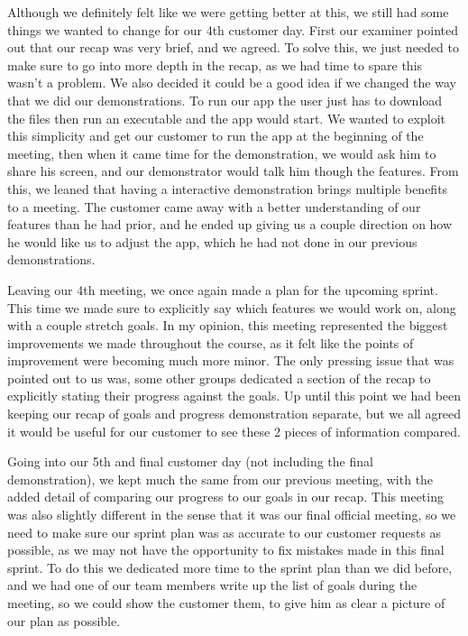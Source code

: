 \documentclass{l3proj}
\begin{document}
Although we definitely felt like we were getting better at this, we still had some things we wanted to change for our 4th customer day. First our examiner pointed out that our recap was very brief, and we agreed. To solve this, we just needed to make sure to go into more depth in the recap, as we had time to spare this wasn’t a problem. We also decided it could be a good idea if we changed the way that we did our demonstrations. To run our app the user just has to download the files then run an executable and the app would start. We wanted to exploit this simplicity and get our customer to run the app at the beginning of the meeting, then when it came time for the demonstration, we would ask him to share his screen, and our demonstrator would talk him though the features. From this, we leaned that having a interactive demonstration brings multiple benefits to a meeting. The customer came away with a better understanding of our features than he had prior, and he ended up giving us a couple direction on how he would like us to adjust the app, which he had not done in our previous demonstrations.\par
Leaving our 4th meeting, we once again made a plan for the upcoming sprint. This time we made sure to explicitly say which features we would work on, along with a couple stretch goals. In my opinion, this meeting represented the biggest improvements we made throughout the course, as it felt like the points of improvement were becoming much more minor. The only pressing issue that was pointed out to us was, some other groups dedicated a section of the recap to explicitly stating their progress against the goals. Up until this point we had been keeping our recap of goals and progress demonstration separate, but we all agreed it would be useful for our customer to see these 2 pieces of information compared.\par
Going into our 5th and final customer day (not including the final demonstration), we kept much the same from our previous meeting, with the added detail of comparing our progress to our goals in our recap. This meeting was also slightly different in the sense that it was our final official meeting, so we need to make sure our sprint plan was as accurate to our customer requests as possible, as we may not have the opportunity to fix mistakes made in this final sprint. To do this we dedicated more time to the sprint plan than we did before, and we had one of our team members write up the list of goals during the meeting, so we could show the customer them, to give him as clear a picture of our plan as possible.\par
\end{document}

